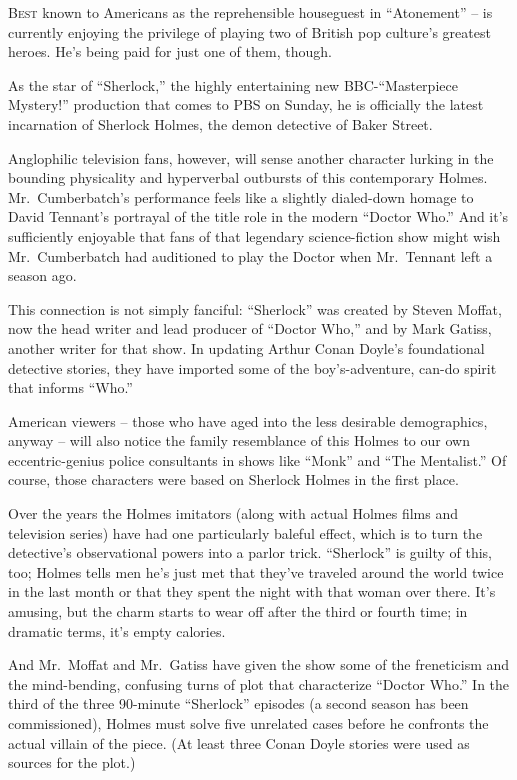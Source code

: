 ﻿\documentclass[12pt]{article}
\begin{document}
\lettrine{B}{est} known to Americans as the reprehensible houseguest in
``Atonement'' -- is currently enjoying the privilege of playing two of British pop culture's
greatest heroes. He's being paid for just one of them, though.

As the star of ``Sherlock,'' the highly entertaining new BBC-``Masterpiece Mystery!'' production
that comes to PBS on Sunday, he is officially the latest incarnation of Sherlock Holmes, the demon
detective of Baker Street.

Anglophilic television fans, however, will sense another character lurking in the bounding
physicality and hyperverbal outbursts of this contemporary Holmes. Mr.~Cumberbatch's performance
feels like a slightly dialed-down homage to David Tennant's portrayal of the title role in the
modern ``Doctor Who.'' And it's sufficiently enjoyable that fans of that legendary science-fiction
show might wish Mr.~Cumberbatch had auditioned to play the Doctor when Mr.~Tennant left a season
ago.

This connection is not simply fanciful: ``Sherlock'' was created by Steven Moffat, now the head
writer and lead producer of ``Doctor Who,'' and by Mark Gatiss, another writer for that show. In
updating Arthur Conan Doyle's foundational detective stories, they have imported some of the
boy's-adventure, can-do spirit that informs ``Who.''

American viewers -- those who have aged into the less desirable demographics, anyway -- will also
notice the family resemblance of this Holmes to our own eccentric-genius police consultants in shows
like ``Monk'' and ``The Mentalist.'' Of course, those characters were based on Sherlock Holmes in
the first place.

Over the years the Holmes imitators (along with actual Holmes films and television series) have had
one particularly baleful effect, which is to turn the detective's observational powers into a parlor
trick. ``Sherlock'' is guilty of this, too; Holmes tells men he's just met that they've traveled
around the world twice in the last month or that they spent the night with that woman over there.
It's amusing, but the charm starts to wear off after the third or fourth time; in dramatic terms,
it's empty calories.

And Mr.~Moffat and Mr.~Gatiss have given the show some of the freneticism and the mind-bending,
confusing turns of plot that characterize ``Doctor Who.'' In the third of the three 90-minute
``Sherlock'' episodes (a second season has been commissioned), Holmes must solve five unrelated
cases before he confronts the actual villain of the piece. (At least three Conan Doyle stories were
used as sources for the plot.)
\end{document}
